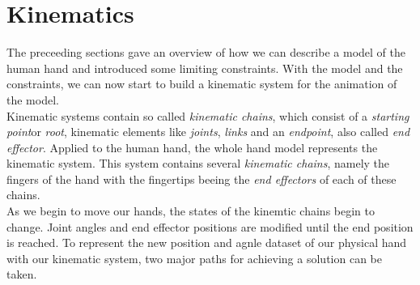 \section{Kinematics}
\label{kinematics}
 The preceeding sections gave an overview of how we can describe a model of the human hand and introduced some limiting constraints. With the model and the constraints, we can now start to build a kinematic system for the animation of the model.\\
Kinematic systems contain so called \textit{kinematic chains}, which consist of a \textit{starting point}or \textit{root}, kinematic elements like \textit{joints}, \textit{links} and an \textit{endpoint}, also called \textit{end effector}. Applied to the human hand, the whole hand model represents the kinematic system. This system contains several \textit{kinematic chains}, namely the fingers of the hand with the fingertips beeing the \textit{end effectors} of each of these chains.\\
As we begin to move our hands, the states of the kinemtic chains begin to change. Joint angles and end effector positions are modified until the end position is reached. To represent the new position and agnle dataset of our physical hand with our kinematic system, two major paths for achieving a solution can be taken.
